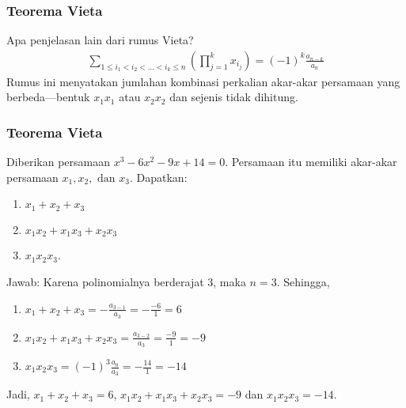 \documentclass[11pt]{beamer}
\begin{document}
	\begin{frame}
		\frametitle{Teorema Vieta}
		Apa penjelasan lain dari rumus Vieta?
		\begin{align*}
			\sum_{1\leq i_1< i_2<...<i_k\leq n}^{}\left(\prod_{j=1}^{k}x_{i_{j}}\right)=\left(-1\right)^k\frac{a_{n-k}}{a_n}
		\end{align*}
		Rumus ini menyatakan jumlahan kombinasi perkalian akar-akar persamaan yang berbeda---bentuk $x_1 x_1$ atau $x_2 x_2$ dan sejenis tidak dihitung.
	\end{frame}
	
	\begin{frame}
		\frametitle{Teorema Vieta}
		Diberikan persamaan $x^3-6x^2-9x+14=0$. Persamaan itu memiliki akar-akar persamaan $x_1, x_2, \text{ dan }  x_3$. Dapatkan:
		\begin{enumerate}
			\item $x_1+x_2+x_3$
			\item $x_1x_2+x_1x_3+x_2x_3$
			\item $x_1x_2x_3$.
		\end{enumerate}
		
		\begin{block}{Jawab:}
			Karena polinomialnya berderajat 3, maka $n=3$. Sehingga,
			\begin{enumerate}
				\item $x_1+x_2+x_3=-\frac{a_{3-1}}{a_3}=-\frac{-6}{1}=6$
				\item $x_1x_2+x_1x_3+x_2x_3=\frac{a_{3-2}}{a_3}=\frac{-9}{1}=-9$
				\item $x_1x_2x_3=(-1)^3\frac{a_0}{a_3}=-\frac{14}{1}=-14$
			\end{enumerate}
		\end{block}
		Jadi, $x_1+x_2+x_3=6$, $x_1x_2+x_1x_3+x_2x_3=-9$ dan $x_1x_2x_3=-14.$
	\end{frame}
	
\end{document}

